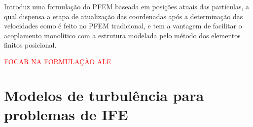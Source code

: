 \documentclass[_ArquivoPrincipal.tex]{subfiles}
\begin{document}
\cite{Giovane} Introduz uma formulação do PFEM baseada em posições atuais das partículas, a qual dispensa a etapa de atualização das coordenadas após a determinação das velocidades como é feito no PFEM tradicional, e tem a vantagem de facilitar o acoplamento monolítico com a estrutura modelada pelo método dos elementos finitos posicional. 

\textcolor{red}{FOCAR NA FORMULAÇÃO ALE}



\section{Modelos de turbulência para problemas de IFE}

 
	
\end{document}
